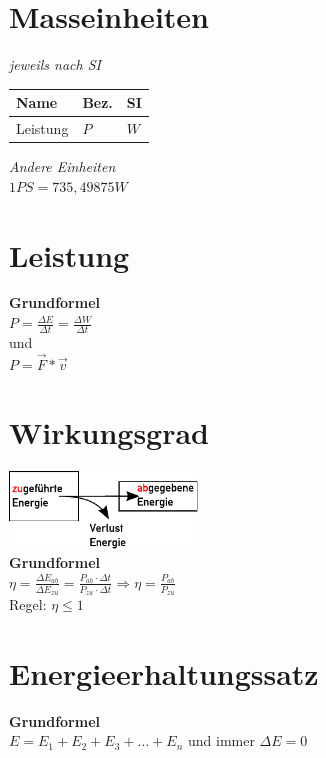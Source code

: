 \documentclass[a4paper,10pt]{article}
\begin{document}
\begin{multicols}{2}

  \section{Masseinheiten}
  \textit{jeweils nach SI}\\
  \begin{tabular}{|l|l|l|}
    \hline
    \textbf{Name} & \textbf{Bez.} & \textbf{SI} \\\hline
    Leistung & \(P\) & \(W\)\\\hline
  \end{tabular}

  \textit{Andere Einheiten}\\
  \(1 PS = 735,49875 W\)\\


  \section{Leistung}
  \textbf{Grundformel}\\
  \(P = \frac{\Delta E}{\Delta t} = \frac{\Delta W}{\Delta t} \)\\
  und\\
  \(P = \vec{F} * \vec{v}\)

  \section{Wirkungsgrad}
  \includegraphics[width=5cm]{wirkungsgrad}\\
  \textbf{Grundformel}\\
  \(\eta = \frac{{\Delta {E_{ab}}}}{{\Delta {E_{zu}}}} = \frac{{{P_{ab}} \cdot \Delta t}}{{{P_{zu}} \cdot \Delta t}} \Rightarrow \eta = \frac{{{P_{ab}}}}{{{P_{zu}}}}\)
  \\
  Regel: \(\eta \leq 1\)
  \section{Energieerhaltungssatz}

  \textbf{Grundformel}\\
  \(E = E_1 + E_2 + E_3 + \dots + E_n\) und immer \(\Delta E = 0\)\\


\end{multicols}
\end{document}
